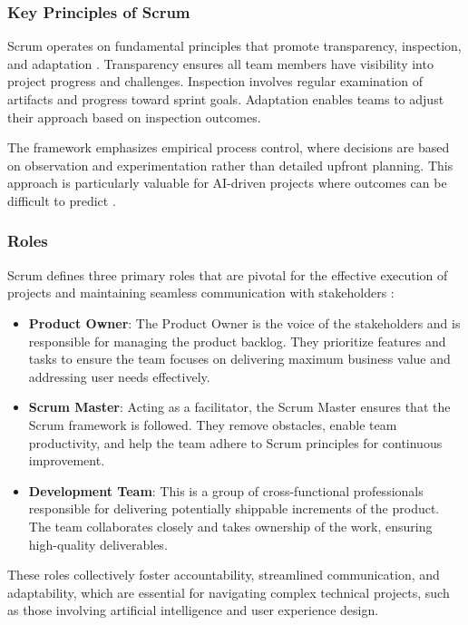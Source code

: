 \subsubsection{Key Principles of Scrum}

Scrum operates on fundamental principles that promote transparency, inspection, and adaptation \cite{scrum_guide}. Transparency ensures all team members have visibility into project progress and challenges. Inspection involves regular examination of artifacts and progress toward sprint goals. Adaptation enables teams to adjust their approach based on inspection outcomes.

The framework emphasizes empirical process control, where decisions are based on observation and experimentation rather than detailed upfront planning. This approach is particularly valuable for AI-driven projects where outcomes can be difficult to predict \cite{empirical_scrum}.

\subsubsection{Roles}

Scrum defines three primary roles that are pivotal for the effective execution of projects and maintaining seamless communication with stakeholders \cite{scrum_roles}:

\begin{itemize}
    \item \textbf{Product Owner}: The Product Owner is the voice of the stakeholders and is responsible for managing the product backlog. They prioritize features and tasks to ensure the team focuses on delivering maximum business value and addressing user needs effectively.
    \item \textbf{Scrum Master}: Acting as a facilitator, the Scrum Master ensures that the Scrum framework is followed. They remove obstacles, enable team productivity, and help the team adhere to Scrum principles for continuous improvement.
    \item \textbf{Development Team}: This is a group of cross-functional professionals responsible for delivering potentially shippable increments of the product. The team collaborates closely and takes ownership of the work, ensuring high-quality deliverables.
\end{itemize}

These roles collectively foster accountability, streamlined communication, and adaptability, which are essential for navigating complex technical projects, such as those involving artificial intelligence and user experience design.

